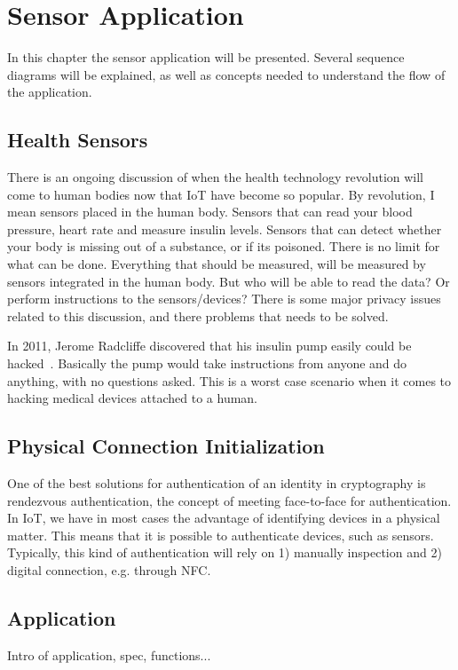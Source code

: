 \chapter{Sensor Application}\label{sensor-application}
In this chapter the sensor application will be presented. 
Several sequence diagrams will be explained, as well as concepts needed to understand the flow of the application. 

\section{Health Sensors}
There is an ongoing discussion of when the health technology revolution will come to human bodies now that \gls{IoT} have become so popular.
By revolution, I mean sensors placed in the human body. 
Sensors that can read your blood pressure, heart rate and measure insulin levels.
Sensors that can detect whether your body is missing out of a substance, or if its poisoned. 
There is no limit for what can be done.
Everything that should be measured, will be measured by sensors integrated in the human body.
But who will be able to read the data?
Or perform instructions to the sensors/devices?
There is some major privacy issues related to this discussion, and there problems that needs to be solved.

In 2011, Jerome Radcliffe discovered that his insulin pump easily could be hacked~\cite{radcliffe2011hacking}.
Basically the pump would take instructions from anyone and do anything, with no questions asked. 
This is a worst case scenario when it comes to hacking medical devices attached to a human.

\section{Physical Connection Initialization}\label{physical_connection_initialization}
One of the best solutions for authentication of an identity in cryptography is rendezvous authentication, the concept of meeting face-to-face for authentication. 
In \gls{IoT}, we have in most cases the advantage of identifying devices in a physical matter. 
This means that it is possible to authenticate devices, such as sensors. 
Typically, this kind of authentication will rely on 1) manually inspection and 2) digital connection, e.g. through \gls{NFC}.

\section{Application}
Intro of application, spec, functions...


